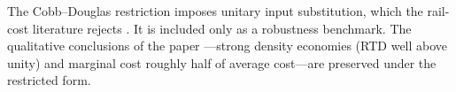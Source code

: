 \documentclass[11pt,a4paper]{article}
\begin{document}
The Cobb--Douglas restriction imposes unitary input substitution, which
the rail-cost literature rejects \citep{wheat2015}. It is included only
as a robustness benchmark. The qualitative conclusions of the paper
---strong density economies (RTD well above unity) and marginal cost
roughly half of average cost---are preserved under the restricted form.
\end{document}
